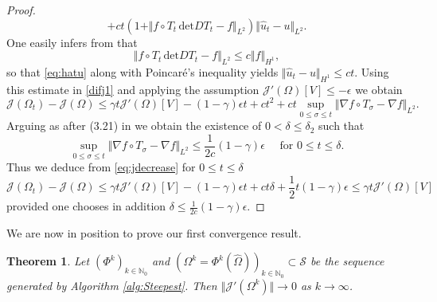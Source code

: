 \documentclass[a4paper,10pt]{article}
\newcommand{\Omref}{\hat \Omega}
\theoremstyle{plain}
\newtheorem{thm}{Theorem}[section]
\theoremstyle{plain}
\numberwithin{equation}{section}
\begin{document}
\begin{proof}
\begin{equation}
+ c t(1+ \Vert  f \circ T_t  \, \mbox{det} D T_t -f \Vert_{L^2})  \Vert \hat u_t -u \Vert_{L^2}.
\end{equation}
One easily infers from \cite[(3.13)]{DHH25-convergence} that
\begin{displaymath}
\Vert  f \circ T_t  \, \mbox{det} D T_t -f \Vert_{L^2} \leq c
\Vert f \Vert_{H^1},
\end{displaymath}
so that \eqref{eq:hatu} along with Poincar\'e's inequality yields
$ \Vert \hat u_t - u \Vert_{H^1} \leq ct$.
Using this estimate in 
\eqref{difj1} and applying the assumption  $\mathcal J'(\Omega)[V] \leq - \epsilon$ we obtain
\begin{equation} \label{eq:jdecrease}
\mathcal J(\Omega_t) - \mathcal J(\Omega) 
 \leq  \gamma t \mathcal J'(\Omega)[V] -(1-\gamma) \epsilon t   + c t^2  + c t  \sup_{0 \leq \sigma \leq t} \Vert \nabla f \circ T_\sigma - \nabla f \Vert_{L^2}. 
\end{equation}
Arguing as after (3.21) in \cite{DHH25-convergence} we obtain
the existence of $0< \delta \leq \delta_2$ such that
\begin{displaymath}
\sup_{0 \leq \sigma \leq t} \Vert \nabla f \circ T_\sigma - \nabla f \Vert_{L^2} \leq 
\frac{1}{2c} (1-\gamma)   \epsilon \quad \mbox{ for } 0 \leq t \leq  \delta.
\end{displaymath}
Thus we deduce from \eqref{eq:jdecrease} for $0 \leq t \leq \delta$
\begin{displaymath}
\mathcal J(\Omega_t) - \mathcal J(\Omega)
 \leq   \gamma t \mathcal J'(\Omega)[V] -(1-\gamma) \epsilon t
 + c t \delta + \frac{1}{2} t(1-\gamma) \epsilon \leq 
 \gamma t \mathcal J'(\Omega)[V]
\end{displaymath}
provided one chooses in addition $\delta \leq \frac{1}{2c}(1-\gamma)
\epsilon$. 
\end{proof}




\noindent
We are now in position to prove our first convergence result.

\begin{thm} \label{conv1}
Let $(\Phi^k)_{k \in \mathbb N_0}$ and $(\Omega^k=\Phi^k(\Omref))_{k \in \mathbb N_0} \subset \mathcal S$ be the sequence generated by Algorithm \ref{alg:Steepest}. 
Then  $\Vert \mathcal J'(\Omega^k) \Vert \rightarrow 0$ as $k \rightarrow \infty$.
\end{thm}
    
\end{document}
